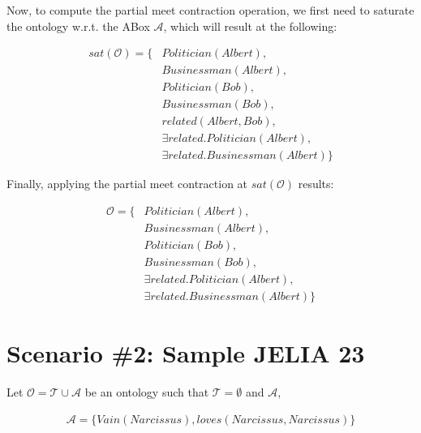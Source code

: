 Now, to compute the partial meet contraction operation, we first need to saturate the ontology w.r.t. the ABox $\mathcal{A}$, which will result at the following:

\begin{equation*}
    \begin{aligned}
        sat(\mathcal{O}) = \{ & Politician(Albert),   \\
                              & Businessman(Albert),  \\
                              & Politician(Bob),      \\
                              & Businessman(Bob),     \\
                              & related(Albert, Bob), \\ 
                              & \exists related.Politician(Albert), \\
                              & \exists related.Businessman(Albert) \}
    \end{aligned}
\end{equation*}

Finally, applying the partial meet contraction at $sat(\mathcal{O})$ results:

\begin{equation*}
    \begin{aligned}
        \mathcal{O} = \{ & Politician(Albert),   \\
                         & Businessman(Albert),  \\
                         & Politician(Bob),      \\
                         & Businessman(Bob),     \\
                         & \exists related.Politician(Albert), \\
                         & \exists related.Businessman(Albert) \}
    \end{aligned}
\end{equation*}

\section{Scenario \#2: Sample JELIA 23}
\label{sec:scenario-2}
Let $\mathcal{O} = \mathcal{T} \cup \mathcal{A}$ be an ontology such that $\mathcal{T} = \emptyset$ and $\mathcal{A}$,

\begin{equation*}
    \begin{aligned}
        \mathcal{A} = \{ Vain(Narcissus), loves(Narcissus, Narcissus) \}
    \end{aligned}
\end{equation*}

